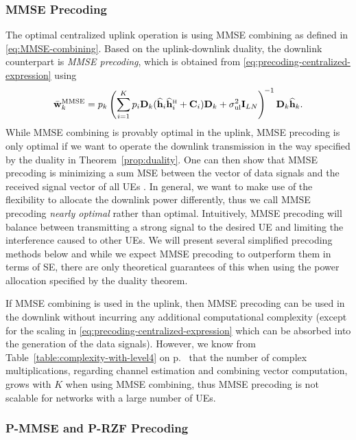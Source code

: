 \subsubsection{MMSE Precoding}

The optimal centralized uplink operation is using MMSE combining as defined in \eqref{eq:MMSE-combining}. Based on the uplink-downlink duality, the downlink counterpart is \emph{MMSE precoding}, which is obtained from \eqref{eq:precoding-centralized-expression} using
\begin{equation} \label{eq:MMSE-precoding}
\bar{\vect{w}}_{k}^{{\rm MMSE}} =    p_{k} \left( \sum\limits_{i=1}^{K} p_{i}  \vect{D}_{k} ( \widehat{\vect{h}}_{i} \widehat{\vect{h}}_{i}^{\Htran} + \vect{C}_{i})\vect{D}_{k} + \sigmaUL \vect{I}_{LN} \right)^{\!-1} \vect{D}_{k}\widehat{\vect{h}}_{k}.
\end{equation}
While MMSE combining is provably optimal in the uplink, MMSE precoding is only optimal if we want to operate the downlink transmission in the way specified by the duality in Theorem~\ref{prop:duality}. One can then show that MMSE precoding is minimizing a sum MSE between the vector of data signals and the received signal vector of all UEs \cite{Vojcic1998a}.
In general, we want to make use of the flexibility to allocate the downlink power differently, thus we call MMSE precoding \emph{nearly optimal} rather than optimal. Intuitively, MMSE precoding will balance between transmitting a strong signal to the desired UE and limiting the interference caused to other UEs.
We will present several simplified precoding methods below and while we expect MMSE precoding to outperform them in terms of SE, there are only theoretical guarantees of this when using the power allocation specified by the duality theorem.

If MMSE combining is used in the uplink, then MMSE precoding can be used in the downlink without incurring any additional computational complexity (except for the scaling in \eqref{eq:precoding-centralized-expression} which can be absorbed into the generation of the data signals). However, we know from Table~\ref{table:complexity-with-level4} on p.~\pageref{table:complexity-with-level4} that the number of complex multiplications, regarding channel estimation and combining vector computation, grows with $K$ when using MMSE combining, thus MMSE precoding is not scalable for networks with a large number of UEs.

\subsubsection{P-MMSE and P-RZF Precoding}


